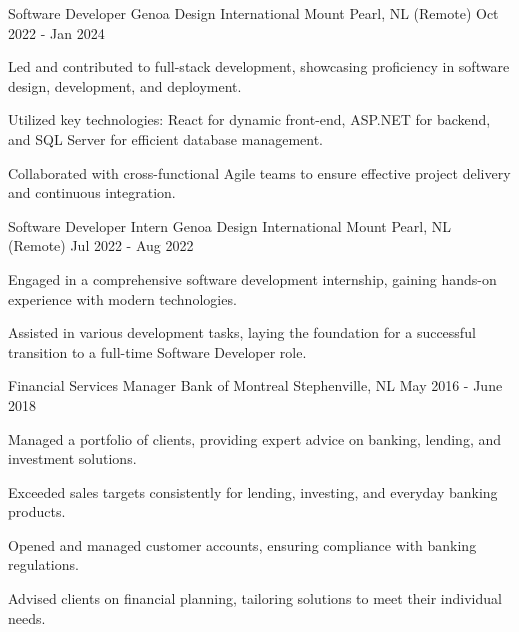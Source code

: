 
\begin{cventries}
	
	\cventry
	{Software Developer} %
	{Genoa Design International} %
	{Mount Pearl, NL (Remote)} %
	{Oct 2022 - Jan 2024} %
	{
		\begin{cvitems} %
			\item {Led and contributed to full-stack development, showcasing proficiency in software design, development, and deployment.}
			\item {Utilized key technologies: React for dynamic front-end, ASP.NET for backend, and SQL Server for efficient database management.}
			\item {Collaborated with cross-functional Agile teams to ensure effective project delivery and continuous integration.}
		\end{cvitems}
	}
	
	\cventry
	{Software Developer Intern} %
	{Genoa Design International} %
	{Mount Pearl, NL (Remote)} %
	{Jul 2022 - Aug 2022} %
	{
		\begin{cvitems} %
			\item {Engaged in a comprehensive software development internship, gaining hands-on experience with modern technologies.}
			\item {Assisted in various development tasks, laying the foundation for a successful transition to a full-time Software Developer role.}
		\end{cvitems}
	}
	
	\cventry
	{Financial Services Manager} %
	{Bank of Montreal} %
	{Stephenville, NL} %
	{May 2016 - June 2018} %
	{
		\begin{cvitems} %
			\item {Managed a portfolio of clients, providing expert advice on banking, lending, and investment solutions.}
			\item {Exceeded sales targets consistently for lending, investing, and everyday banking products.}
			\item {Opened and managed customer accounts, ensuring compliance with banking regulations.}
			\item {Advised clients on financial planning, tailoring solutions to meet their individual needs.}
		\end{cvitems}
	}
	

\end{cventries}

